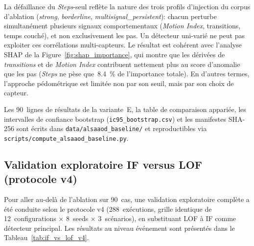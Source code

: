 La défaillance du \textit{Steps}-seul reflète la nature des trois profils
d'injection du corpus d'ablation (\emph{strong}, \emph{borderline},
\emph{multisignal\_persistent}): chacun perturbe simultanément plusieurs
signaux comportementaux (\emph{Motion Index}, transitions, temps
couché), et non exclusivement les pas. Un détecteur uni-varié ne peut
pas exploiter ces corrélations multi-capteurs. Le résultat est cohérent
avec l'analyse SHAP de la Figure~\ref{fig:shap_importance}, qui montre
que les dérivées de \emph{transitions} et de \emph{Motion Index}
contribuent nettement plus au score d'anomalie que les pas
(\textit{Steps} ne pèse que~8.4~\% de l'importance totale). En d'autres
termes, l'approche pédométrique est limitée non par son seuil, mais par
son choix de capteur.

Les 90~lignes de résultats de la variante~E, la table de comparaison
appariée, les intervalles de confiance bootstrap
(\texttt{ic95\_bootstrap.csv}) et les manifestes SHA-256 sont écrits dans
\texttt{data/alsaaod\_baseline/} et reproductibles via
\texttt{scripts/compute\_alsaaod\_baseline.py}.

\FloatBarrier
\subsection{Validation exploratoire IF versus LOF (protocole v4)}

Pour aller au-delà de l'ablation sur 90~cas, une validation exploratoire complète a été
conduite selon le protocole v4 (288~exécutions, grille identique de 12~configurations
$\times$ 8~seeds $\times$ 3~scénarios), en substituant LOF à IF comme détecteur principal.
Les résultats au niveau événement sont présentés dans le Tableau~\ref{tab:if_vs_lof_v4}.

